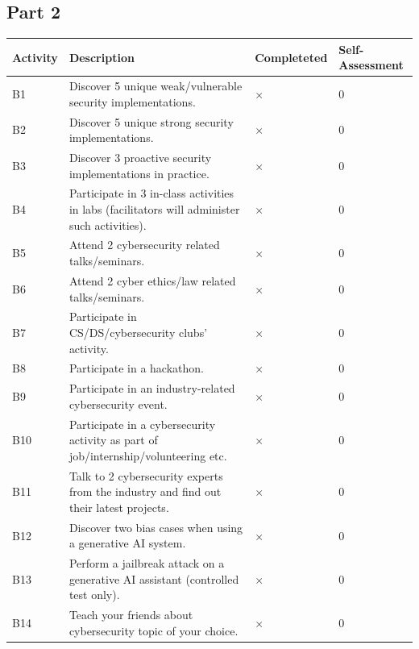 \documentclass[titlepage]{article}
\begin{document}
    \bigskip

    \centering\subsection*{Part 2}
        \begin{tabular}{ |p{4em}|p{30em}|C{6em}|C{5em}| }
            \hline
            Activity & Description & Completeted & Self-Assessment \\
            \hline
            B1 & Discover 5 unique weak/vulnerable security implementations. & $\times$ & 0 \\
            \hline
            B2 & Discover 5 unique strong security implementations. & $\times$ & 0 \\
            \hline
            B3 & Discover 3 proactive security implementations in practice. & $\times$ & 0 \\
            \hline
            B4 & Participate in 3 in-class activities in labs (facilitators will administer such activities). & $\times$ & 0 \\
            \hline
            B5 & Attend 2 cybersecurity related talks/seminars. & $\times$ & 0 \\
            \hline
            B6 & Attend 2 cyber ethics/law related talks/seminars. & $\times$ & 0 \\
            \hline
            B7 & Participate in CS/DS/cybersecurity clubs’ activity. & $\times$ & 0 \\
            \hline
            B8 & Participate in a hackathon. & $\times$ & 0 \\
            \hline
            B9 & Participate in an industry-related cybersecurity event. & $\times$ & 0 \\
            \hline
            B10 & Participate in a cybersecurity activity as part of job/internship/volunteering etc. & $\times$ & 0 \\
            \hline
            B11 & Talk to 2 cybersecurity experts from the industry and find out their latest projects. & $\times$ & 0 \\
            \hline
            B12 & Discover two bias cases when using a generative AI system. & $\times$ & 0 \\
            \hline
            B13 & Perform a jailbreak attack on a generative AI assistant (controlled test only). & $\times$ & 0 \\
            \hline
            B14 & Teach your friends about cybersecurity topic of your choice. & $\times$ & 0 \\

\end{tabular}
\end{document}

